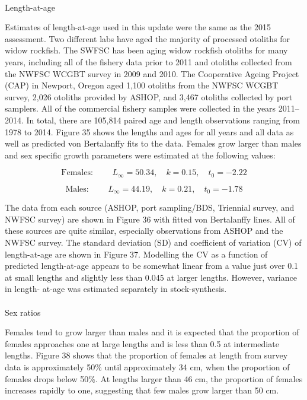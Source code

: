 \documentclass[
]{scrartcl}
\makeatletter
\let\oldparagraph\paragraph
\renewcommand{\paragraph}{
    \@ifstar
      \xxxParagraphStar
      \xxxParagraphNoStar
  }
\newcommand{\xxxParagraphStar}[1]{\oldparagraph*{#1}\mbox{}}
\newcommand{\xxxParagraphNoStar}[1]{\oldparagraph{#1}\mbox{}}
\makeatother
\begin{document}
\paragraph{Length-at-age}\label{length-at-age}

Estimates of length-at-age used in this update were the same as the 2015
assessment. Two different labs have aged the majority of processed
otoliths for widow rockfish. The SWFSC has been aging widow rockfish
otoliths for many years, including all of the fishery data prior to 2011
and otoliths collected from the NWFSC WCGBT survey in 2009 and 2010. The
Cooperative Ageing Project (CAP) in Newport, Oregon aged 1,100 otoliths
from the NWFSC WCGBT survey, 2,026 otoliths provided by ASHOP, and 3,467
otoliths collected by port samplers. All of the commercial fishery
samples were collected in the years 2011--2014. In total, there are
105,814 paired age and length observations ranging from 1978 to 2014.
Figure 35 shows the lengths and ages for all years and all data as well
as predicted von Bertalanffy fits to the data. Females grow larger than
males and sex specific growth parameters were estimated at the following
values:

\[
\text{Females: } \qquad  L_\infty = 50.34,\quad k=0.15, \quad t_0 = -2.22
\]

\[
\text{Males: } \qquad  L_\infty = 44.19,\quad k=0.21, \quad t_0 = -1.78
\]

The data from each source (ASHOP, port sampling/BDS, Triennial survey,
and NWFSC survey) are shown in Figure 36 with fitted von Bertalanffy
lines. All of these sources are quite similar, especially observations
from ASHOP and the NWFSC survey. The standard deviation (SD) and
coefficient of variation (CV) of length-at-age are shown in Figure 37.
Modelling the CV as a function of predicted length-at-age appears to be
somewhat linear from a value just over 0.1 at small lengths and slightly
less than 0.045 at larger lengths. However, variance in length- at-age
was estimated separately in stock-synthesis.

\paragraph{Sex ratios}\label{sex-ratios}

Females tend to grow larger than males and it is expected that the
proportion of females approaches one at large lengths and is less than
0.5 at intermediate lengths. Figure 38 shows that the proportion of
females at length from survey data is approximately 50\% until
approximately 34 cm, when the proportion of females drops below 50\%. At
lengths larger than 46 cm, the proportion of females increases rapidly
to one, suggesting that few males grow larger than 50 cm.
\end{document}
